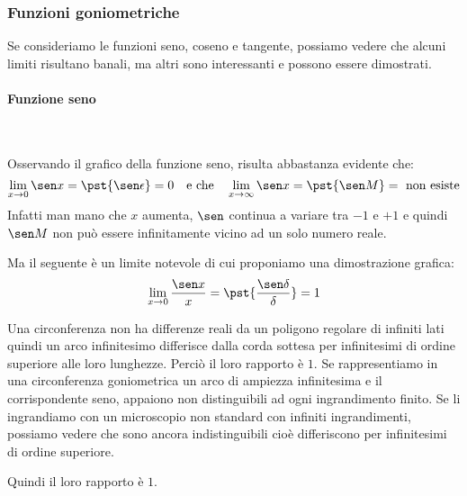 \subsubsection{Funzioni goniometriche}

Se consideriamo le funzioni seno, coseno e tangente, possiamo vedere che 
alcuni limiti risultano banali, ma altri sono interessanti e possono essere 
dimostrati.

\begin{minipage}{.66\textwidth}
\begin{center} \sinusoide \end{center}
\begin{center} \cosinusoide \end{center}
\end{minipage}
\hfill
\begin{minipage}{.33\textwidth}
\begin{center} \tangentoide \end{center}
\end{minipage}

\paragraph{Funzione seno}~

Osservando il grafico della funzione seno, risulta abbastanza evidente che:
\[\lim_{x \rightarrow 0}{\sen x} = \pst{\sen \epsilon} = 0
\quad \text{e che} \quad 
\lim_{x \rightarrow \infty}{\sen x} = \pst{\sen M} = \text{ non esiste}\]
Infatti man mano che \(x\) aumenta, \(\sen \)
continua a variare tra \(-1\) e \(+1\) e quindi 
\(\sen M\) non può essere infinitamente vicino ad un solo numero reale.

Ma il seguente è un limite notevole di cui proponiamo una dimostrazione 
grafica:
\[\lim_{x \rightarrow 0}\frac{\sen x}{x} = 
  \pst{\frac{\sen \delta}{\delta}} = 1\]
\begin{minipage}{.49\textwidth}
Una circonferenza non ha differenze reali da un poligono regolare di 
infiniti lati quindi un arco infinitesimo differisce dalla corda 
sottesa per infinitesimi di ordine superiore alle loro lunghezze. Perciò il 
loro rapporto è \(1\).
Se rappresentiamo in una circonferenza goniometrica un arco di ampiezza 
infinitesima e il corrispondente seno, appaiono non distinguibili ad ogni 
ingrandimento finito. Se li ingrandiamo con un microscopio non standard con 
infiniti ingrandimenti, possiamo vedere che sono ancora indistinguibili 
cioè differiscono per infinitesimi di ordine superiore. 

Quindi il loro rapporto è \(1\).
\end{minipage}
\hfill
\begin{minipage}{.49\textwidth}
\begin{center} \limiteseno \end{center}
\end{minipage}

